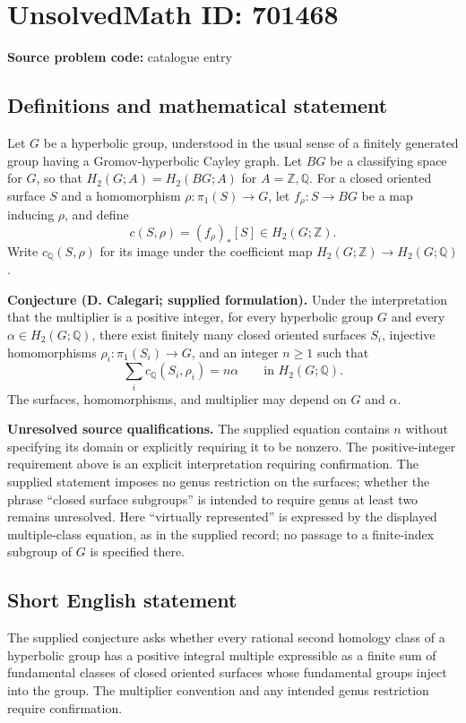 \documentclass[11pt]{article}
\newcommand{\Z}{\mathbb{Z}}
\newcommand{\Q}{\mathbb{Q}}
\begin{document}
\section*{UnsolvedMath ID: 701468}
\textbf{Source problem code:} catalogue entry
\subsection{Definitions and mathematical statement}
Let \(G\) be a hyperbolic group, understood in the usual sense of a finitely generated group having a Gromov-hyperbolic Cayley graph. Let \(BG\) be a classifying space for \(G\), so that \(H_2(G;A)=H_2(BG;A)\) for \(A=\Z,\Q\). For a closed oriented surface \(S\) and a homomorphism \(\rho:\pi_1(S)\to G\), let \(f_\rho:S\to BG\) be a map inducing \(\rho\), and define
\[
c(S,\rho)=(f_\rho)_*[S]\in H_2(G;\Z).
\]
Write \(c_{\Q}(S,\rho)\) for its image under the coefficient map \(H_2(G;\Z)\to H_2(G;\Q)\).

\textbf{Conjecture (D. Calegari; supplied formulation).} Under the interpretation that the multiplier is a positive integer, for every hyperbolic group \(G\) and every \(\alpha\in H_2(G;\Q)\), there exist finitely many closed oriented surfaces \(S_i\), injective homomorphisms \(\rho_i:\pi_1(S_i)\to G\), and an integer \(n\geq 1\) such that
\[
\sum_i c_{\Q}(S_i,\rho_i)=n\alpha
\qquad\text{in }H_2(G;\Q).
\]
The surfaces, homomorphisms, and multiplier may depend on \(G\) and \(\alpha\).

\textbf{Unresolved source qualifications.} The supplied equation contains \(n\) without specifying its domain or explicitly requiring it to be nonzero. The positive-integer requirement above is an explicit interpretation requiring confirmation. The supplied statement imposes no genus restriction on the surfaces; whether the phrase ``closed surface subgroups'' is intended to require genus at least two remains unresolved. Here ``virtually represented'' is expressed by the displayed multiple-class equation, as in the supplied record; no passage to a finite-index subgroup of \(G\) is specified there.
\subsection{Short English statement}
The supplied conjecture asks whether every rational second homology class of a hyperbolic group has a positive integral multiple expressible as a finite sum of fundamental classes of closed oriented surfaces whose fundamental groups inject into the group. The multiplier convention and any intended genus restriction require confirmation.
\end{document}
